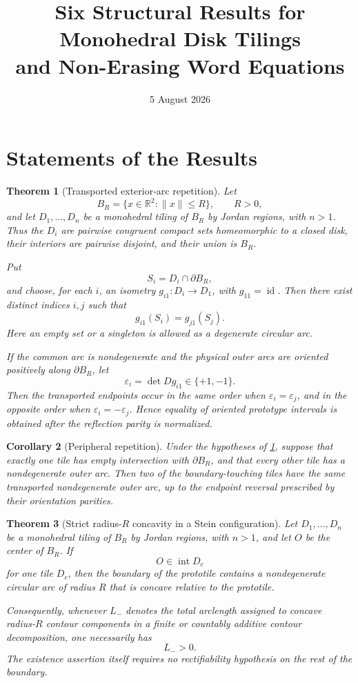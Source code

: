 \documentclass[11pt]{article}
\title{\textbf{Six Structural Results for Monohedral Disk Tilings\\and Non-Erasing Word Equations}}
\author{}
\date{5 August 2026}
\newtheorem{theorem}{Theorem}[section]
\newtheorem{corollary}[theorem]{Corollary}
\newcommand{\BR}{B_R}
\newcommand{\interior}{\operatorname{int}}
\newcommand{\id}{\operatorname{id}}
\newcommand{\eps}{\varepsilon}
\begin{document}
\maketitle
\vspace{-2.0em}

\section{Statements of the Results}

\begin{theorem}[Transported exterior-arc repetition]\label{thm:repetition}
Let
\[
  \BR=\{x\in\mathbb R^2:\|x\|\le R\},\qquad R>0,
\]
and let $D_1,\ldots,D_n$ be a monohedral tiling of $\BR$ by Jordan regions, with $n>1$. Thus the $D_i$ are pairwise congruent compact sets homeomorphic to a closed disk, their interiors are pairwise disjoint, and their union is $\BR$.

Put
\[
  S_i=D_i\cap\partial\BR,
\]
and choose, for each $i$, an isometry $g_{i1}:D_i\to D_1$, with $g_{11}=\id$. Then there exist distinct indices $i,j$ such that
\[
  g_{i1}(S_i)=g_{j1}(S_j).
\]
Here an empty set or a singleton is allowed as a degenerate circular arc.

If the common arc is nondegenerate and the physical outer arcs are oriented positively along $\partial\BR$, let
\[
  \eps_i=\det Dg_{i1}\in\{+1,-1\}.
\]
Then the transported endpoints occur in the same order when $\eps_i=\eps_j$, and in the opposite order when $\eps_i=-\eps_j$. Hence equality of \emph{oriented} prototype intervals is obtained after the reflection parity is normalized.
\end{theorem}

\begin{corollary}[Peripheral repetition]\label{cor:peripheral}
Under the hypotheses of \cref{thm:repetition}, suppose that exactly one tile has empty intersection with $\partial\BR$, and that every other tile has a nondegenerate outer arc. Then two of the boundary-touching tiles have the same transported nondegenerate outer arc, up to the endpoint reversal prescribed by their orientation parities.
\end{corollary}

\begin{theorem}[Strict radius-$R$ concavity in a Stein configuration]\label{thm:concavity}
Let $D_1,\ldots,D_n$ be a monohedral tiling of $\BR$ by Jordan regions, with $n>1$, and let $O$ be the center of $\BR$. If
\[
  O\in\interior D_c
\]
for one tile $D_c$, then the boundary of the prototile contains a nondegenerate circular arc of radius $R$ that is concave relative to the prototile.

Consequently, whenever $L_-$ denotes the total arclength assigned to concave radius-$R$ contour components in a finite or countably additive contour decomposition, one necessarily has
\[
  L_->0.
\]
The existence assertion itself requires no rectifiability hypothesis on the rest of the boundary.
\end{theorem}
\end{document}
